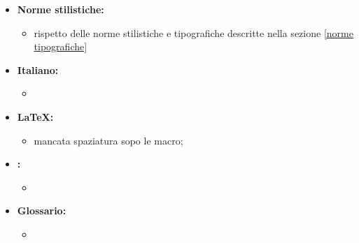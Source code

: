 \documentclass[12pt,a4paper]{article}
\begin{document}
\begin{itemize}
	\item \textbf{Norme stilistiche:}
	\begin{itemize}
		\item rispetto delle norme stilistiche e tipografiche descritte nella sezione \ref{norme tipografiche}
	\end{itemize}
	\item \textbf{Italiano:}
	\begin{itemize}
		\item 
	\end{itemize}
	\item \textbf{\LaTeX:}
	\begin{itemize}
		\item mancata spaziatura sopo le macro;
	\end{itemize}
	\item \textbf{:}
	\begin{itemize}
		\item 
	\end{itemize}
	\item \textbf{Glossario:}
	\begin{itemize}
		\item 
	\end{itemize}
\end{itemize}
\end{document}

